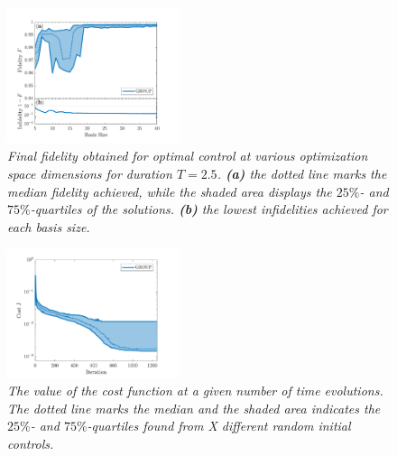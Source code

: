 \documentclass[%
 reprint,
 amsmath,amssymb,
 aps,
pra,
]{revtex4-1}
\begin{document}
\begin{figure}[h!]
    \centering
    \includegraphics[width=0.45\textwidth]{Figures/FidelityBasisSize.pdf}
    \caption{\textit{Final fidelity obtained for optimal control at various optimization space dimensions for duration $T = 2.5$. \textbf{(a)} the dotted line marks the median fidelity achieved, while the shaded area displays the $25\%$- and $75\%$-quartiles of the solutions. \textbf{(b)} the lowest infidelities achieved for each basis size.}}
    \label{fig:FidelityBasisSize}
\end{figure}

\begin{figure}[h!]
    \centering
    \includegraphics[width=0.45\textwidth]{Figures/CostProgress.pdf}
    \caption{\textit{The value of the cost function at a given number of time evolutions. The dotted line marks the median and the shaded area indicates the $25\%$- and $75\%$-quartiles found from X different random initial controls.}}
    \label{fig:FidelityBasisSize5}
\end{figure}


%
%
\end{document}

